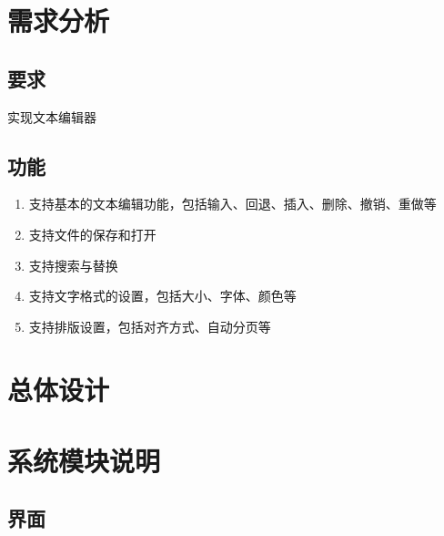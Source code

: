 \documentclass{./source/Report}
\date{\today}
\begin{document}
\makecover

\tableofcontents

\newpage

\section{需求分析}

\subsection{要求}
实现文本编辑器
\subsection{功能}
\begin{enumerate}
    \item 支持基本的文本编辑功能，包括输入、回退、插入、删除、撤销、重做等
    \item 支持文件的保存和打开
    \item 支持搜索与替换
    \item 支持文字格式的设置，包括大小、字体、颜色等
    \item 支持排版设置，包括对齐方式、自动分页等
\end{enumerate}

\section{总体设计}


\section{系统模块说明}

\subsection{界面}
\end{document}
